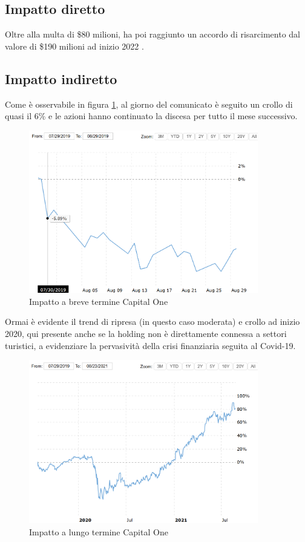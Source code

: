 \documentclass[12pt,a4paper,openright,twoside]{report}
\begin{document}
\subsection{Impatto diretto}
Oltre alla multa di \$80  milioni, ha poi raggiunto un accordo di risarcimento dal valore di \$190 milioni ad inizio 2022 \cite{CapitalOne_settlement}.
\subsection{Impatto indiretto}
Come \`e osservabile in figura \ref{fig:cpto1}, al giorno del comunicato \`e seguito un crollo di quasi il 6\% e le azioni hanno continuato la discesa per tutto il mese successivo.\\ 
\begin{figure}[H] 
\begin{center} 
\includegraphics[width=10cm]{figures/capitalOne_short.png} 
\caption[Grafico Capital One short]{Impatto a breve termine Capital One}\label{fig:cpto1}
\end{center}
\end{figure}

Ormai \`e evidente il trend di ripresa (in questo caso moderata) e crollo ad inizio 2020, qui presente anche se la holding non \`e direttamente connessa a settori turistici, a evidenziare la pervasivit\`a della crisi finanziaria seguita al Covid-19.\\

\begin{figure}[H] 
\begin{center} 
\includegraphics[width=10cm]{figures/CapitalOne_long.png} 
\caption[Grafico Capital One long]{Impatto a lungo termine  Capital One}\label{fig:cpto2}
\end{center}
\end{figure}
\end{document}
